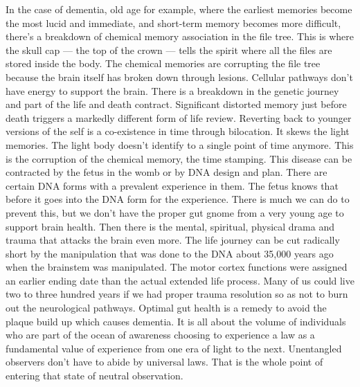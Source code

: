 In the case of dementia, old age for example, where the earliest
memories become the most lucid and immediate, and short-term memory
becomes more difficult, there's a breakdown of chemical memory
association in the file tree. This is where the skull cap --- the top of
the crown --- tells the spirit where all the files are stored inside the
body. The chemical memories are corrupting the file tree because the
brain itself has broken down through lesions. Cellular pathways don't
have energy to support the brain. There is a breakdown in the genetic
journey and part of the life and death contract. Significant distorted
memory just before death triggers a markedly different form of life
review. Reverting back to younger versions of the self is a co-existence
in time through bilocation. It skews the light memories. The light body
doesn't identify to a single point of time anymore. This is the
corruption of the chemical memory, the time stamping. This disease can
be contracted by the fetus in the womb or by DNA design and plan. There
are certain DNA forms with a prevalent experience in them. The fetus
knows that before it goes into the DNA form for the experience. There is
much we can do to prevent this, but we don't have the proper gut gnome
from a very young age to support brain health. Then there is the mental,
spiritual, physical drama and trauma that attacks the brain even more.
The life journey can be cut radically short by the manipulation that was
done to the DNA about 35,000 years ago when the brainstem was
manipulated. The motor cortex functions were assigned an earlier ending
date than the actual extended life process. Many of us could live two to
three hundred years if we had proper trauma resolution so as not to burn
out the neurological pathways. Optimal gut health is a remedy to avoid
the plaque build up which causes dementia. It is all about the volume of
individuals who are part of the ocean of awareness choosing to
experience a law as a fundamental value of experience from one era of
light to the next. Unentangled observers don't have to abide by
universal laws. That is the whole point of entering that state of
neutral observation.

